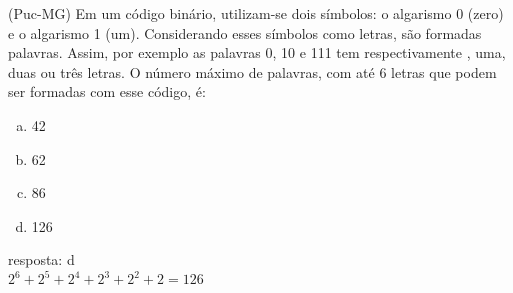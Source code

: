 \begin{ex}
 (Puc-MG) Em um código binário, utilizam-se dois símbolos: o algarismo 0 (zero) e o algarismo 1 (um). Considerando esses símbolos como letras, são formadas palavras. Assim, por exemplo as palavras 0, 10 e 111 tem respectivamente , uma, duas ou três letras. O número máximo de palavras, com até 6 letras que podem ser formadas com esse código, é:
    \begin{enumerate}[(a)]
    \item 42
    \item 62
    \item 86
    \item 126
    \end{enumerate}
      \begin{sol} 
      resposta: d  \\
      $2^6+2^5+2^4+2^3+2^2+2=126$
        
      \end{sol}
\end{ex}